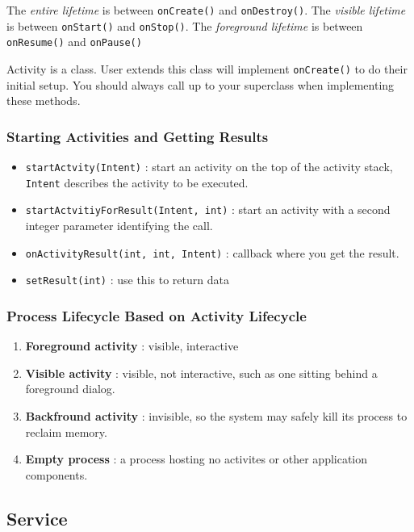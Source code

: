 The \emph{entire lifetime} is between \texttt{onCreate()} and
\texttt{onDestroy()}. The \emph{visible lifetime} is between
\texttt{onStart()} and \texttt{onStop()}. The \emph{foreground lifetime} is
between \texttt{onResume()} and \texttt{onPause()}

Activity is a class. User extends this class will implement \texttt{onCreate()}
to do their initial setup. You should always call up to your superclass when
implementing these methods.

\subsubsection{Starting Activities and Getting Results}

\begin{itemize}
\item \texttt{startActvity(Intent)} : start an activity on the top of the
  activity stack, \texttt{Intent} describes the activity to be executed.
\item \texttt{startActvitiyForResult(Intent, int)} : start an activity with a
  second integer parameter identifying the call.
\item \texttt{onActivityResult(int, int, Intent)} : callback where you get the
  result.
\item \texttt{setResult(int)} : use this to return data
\end{itemize}

\subsubsection{Process Lifecycle Based on Activity Lifecycle}
\begin{enumerate}
\item \textbf{Foreground activity} : visible, interactive
\item \textbf{Visible activity} : visible, not interactive, such as one sitting
  behind a foreground dialog.
\item \textbf{Backfround activity} : invisible, so the system may safely kill
  its process to reclaim memory.
\item \textbf{Empty process} : a process hosting no activites or other
  application components.
\end{enumerate} 


\subsection{Service}

